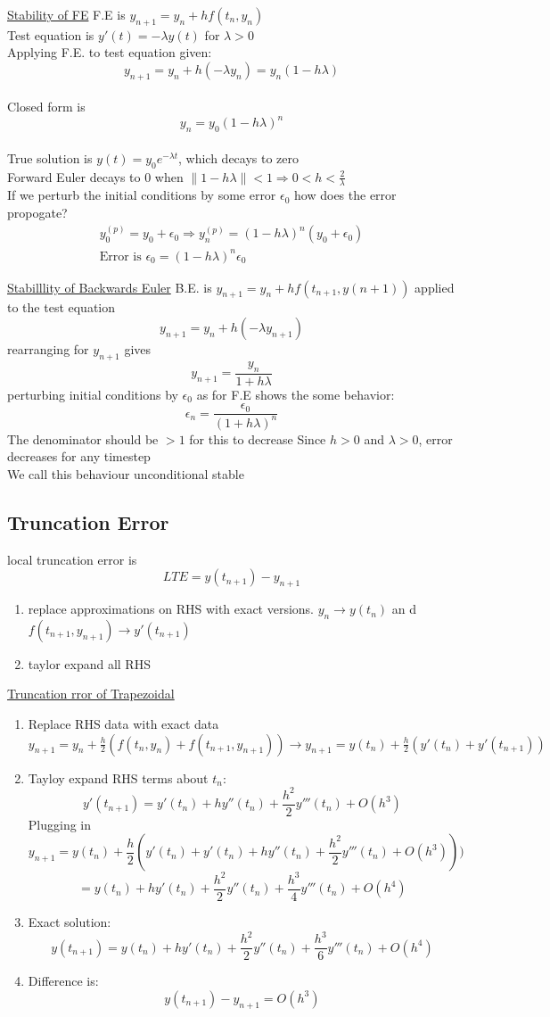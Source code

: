 \documentclass[10pt,usletter]{article}
\begin{document}
\underline{Stability of FE}
F.E is $y_{n+1}=y_n+hf(t_n,y_n)$\\
Test equation is $y'(t)=-\lambda y(t)$ for $\lambda > 0$\\
Applying F.E. to test equation given:
$$y_{n+1}=y_n+h(-\lambda y_n)=y_n(1-h\lambda)$$\\
Closed form is $$y_n=y_0(1-h\lambda)^n$$\\
True solution is $y(t)=y_0e^{-\lambda t}$, which decays to zero\\
Forward Euler decays to 0 when $\|1-h\lambda\|<1\Rightarrow 0 <h < \frac{2}{\lambda}$\\
If we perturb the initial conditions by some error $\epsilon_0$ how does the error propogate?
\begin{align*}
y_0^{(p)}=y_0+\epsilon_0\Rightarrow y_n^{(p)}=(1-h\lambda)^n(y_0+\epsilon_0)\\
\text{Error is } \epsilon_0=(1-h\lambda)^n\epsilon_0
\end{align*}


\underline{Stabilllity of Backwards Euler}
B.E. is $y_{n+1}=y_n+hf(t_{n+1},y(n+1))$
applied to the test equation $$y_{n+1}=y_n+h(-\lambda y_{n+1})$$
rearranging for $y_{n+1}$ gives $$y_{n+1}=\frac{y_n}{1+h\lambda}$$
perturbing initial conditions by $\epsilon_0$ as for F.E shows the some behavior:
$$\epsilon_n=\frac{\epsilon_0}{(1+h\lambda)^n}$$
The denominator should be $>1$ for this to decrease Since $h>0$ and $\lambda>0$, error decreases for any timestep\\
We call this behaviour unconditional stable


\subsection{Truncation Error}
local truncation error is $$LTE=y(t_{n+1})-y_{n+1}$$
\begin{enumerate}
\item replace approximations on RHS with exact versions. $y_n\rightarrow y(t_n)$ an d $f(t_{n+1},y_{n+1})\rightarrow y'(t_{n+1})$
\item taylor expand all RHS
\end{enumerate}
\underline{Truncation rror of Trapezoidal}
\begin{enumerate}
\item Replace RHS data with exact data $y_{n+1}=y_n+\frac{h}{2}(f(t_n, y_n)+f(t_{n+1},y_{n+1}))\rightarrow y_{n+1}=y(t_n)+\frac{h}{2}(y'(t_n)+y'(t_{n+1}))$
\item Tayloy expand RHS terms about $t_n$:
$$y'(t_{n+1})=y'(t_n)+hy''(t_n)+\frac{h^2}{2}y'''(t_n)+O(h^3)$$ 
Plugging in 
$$y_{n+1}=y(t_n)+\frac{h}{2}(y'(t_n)+y'(t_n)+hy''(t_n)+\frac{h^2}{2}y'''(t_n)+O(h^3)))$$
$$=y(t_n)+hy'(t_n)+\frac{h^2}{2}y''(t_n) + \frac{h^3}{4}y'''(t_n)+O(h^4)$$
\item Exact solution:
$$y(t_{n+1})=y(t_n)+hy'(t_n)+\frac{h^2}{2}y''(t_n)+\frac{h^3}{6}y'''(t_n)+O(h^4)$$
\item Difference is:
$$y(t_{n+1})-y_{n+1}=O(h^3)$$
\end{enumerate}
\end{document}
